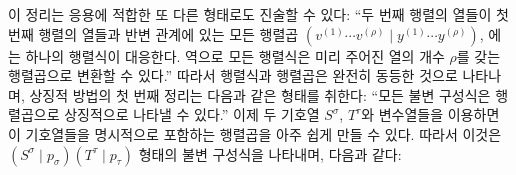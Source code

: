 이 정리는 응용에 적합한 또 다른 형태로도 진술할 수 있다: ``두 번째 행렬의 열들이 첫 번째 행렬의 열들과 반변 관계에 있는 모든 행렬곱 $(v^{(1)}\cdots v^{(\rho)}\mid y^{(1)}\cdots y^{(\rho)})$, 에는 하나의 행렬식이 대응한다. 역으로 모든 행렬식은 미리 주어진 열의 개수 $\rho$를 갖는 행렬곱으로 변환할 수 있다.'' 따라서 행렬식과 행렬곱은 완전히 동등한 것으로 나타나며, 상징적 방법의 첫 번째 정리는 다음과 같은 형태를 취한다: ``모든 불변 구성식은 행렬곱으로 상징적으로 나타낼 수 있다.'' 이제 두 기호열 $S^\sigma$, $T^\tau$와 변수열들을 이용하면 이 기호열들을 명시적으로 포함하는 행렬곱을 아주 쉽게 만들 수 있다. 따라서 이것은 $(S^\sigma\mid p_\sigma)(T^\tau\mid p_\tau)$ 형태의 불변 구성식을 나타내며, 다음과 같다:
